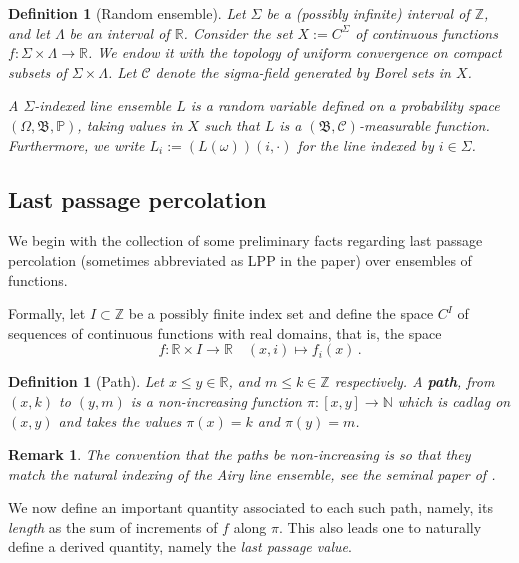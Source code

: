 \documentclass[11pt, reqno]{amsart}
\numberwithin{equation}{section}
\newcounter{dummy} \numberwithin{dummy}{section}
\newtheorem{definition}[dummy]{Definition}
\newtheorem*{remark}{Remark}
\newcommand{\R}{\ensuremath{\mathbb{R}}}
\newcommand{\Z}{\ensuremath{\mathbb{Z}}}
\newcommand{\PP}{\ensuremath{\mathbb{P}}}
\begin{document}
\begin{definition}[Random ensemble]\label{def: random ensemble}
    Let $\Sigma$ be a (possibly infinite) interval of $\Z$, and let $\Lambda$ be an interval of $\R$. Consider the set \(X:=C^\Sigma\) of continuous functions $f:\Sigma\times \Lambda \rightarrow \R$. We endow it with the topology of uniform convergence on compact subsets of $\Sigma\times\Lambda$. Let $\mathscr{C}$ denote the sigma-field  generated by Borel sets in $X$.

    A {\it $\Sigma$-indexed line ensemble} $L$ is a random variable defined on a probability space $(\Omega,\mathfrak{B},\PP)$, taking values in $X$ such that $L$ is a $(\mathfrak{B},\mathscr{C})$-measurable function. Furthermore, we write $L_i:=(L(\omega))(i,\cdot)$ for the line indexed by $i\in\Sigma$. 
\end{definition}%

\subsection{Last passage percolation} We begin with the collection of some preliminary facts regarding last passage percolation (sometimes abbreviated as LPP in the paper) over ensembles of functions.

Formally, let \(I\subset \mathbb{Z}\) be a possibly finite index set and define the space \(C^{I}\) of sequences of continuous functions with real domains, that is, the space
\[f: \mathbb{R}\times I\to \mathbb{R}\quad (x,i)\mapsto f_i(x)\,.\]

\begin{definition}[Path] Let \(x\leq y \in \mathbb{R}\), and \(m\leq k \in \mathbb{Z}\) respectively. A \textbf{path}, from \((x,k)\) to \((y,m)\) is a non-increasing  function \(\pi: [x,y] \to \mathbb{N}\) which is cadlag on \((x,y)\) and takes the values \(\pi(x)= k\) and \(\pi(y)= m\).
\label{def: path}
\end{definition}%

\begin{remark}
    The convention that the paths be non-increasing is so that they match the natural indexing of the Airy line ensemble, see the seminal paper of \cite{Corwin2014Brownian}. 
\end{remark}

We now define an important quantity associated to each such path, namely, its \textit{length} as the sum of increments of \(f\) along \(\pi\). This also leads one to naturally define a derived quantity, namely the \textit{last passage value}.
\end{document}
